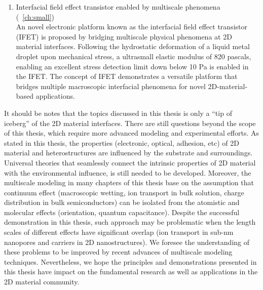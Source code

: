 \begin{enumerate}
\item Interfacial field effect transistor enabled by multiscale phenomena (~\autoref{ch:small})\\
  An novel electronic platform known as the interfacial field effect
  transistor (IFET) is proposed by bridging multiscale physical
  phenomena at 2D material interfaces. Following the hydrostatic
  deformation of a liquid metal droplet upon mechanical stress, a
  ultrasmall elastic modulus of 820 pascals, enabling an
  excellent stress detection limit down below 10 Pa is enabled in the
  IFET. The concept of IFET demonstrates a versatile platform that
  bridges multiple macroscopic interfacial phenomena for novel
  2D-material-based applications.
\end{enumerate}

It should be notes that the topics discussed in this thesis is only a
``tip of iceberg'' of the 2D material interfaces. There are still
questions beyond the scope of this thesis, which require more advanced
modeling and experimental efforts.
% 
As stated in this thesis, the properties (electronic, optical,
adhesion, etc) of 2D material and heterostructures are influenced by
the substrate and surroundings. Universal theories that seamlessly
connect the intrinsic properties of 2D material with the environmental
influence, is still needed to be developed. Moreover, the multiscale
modeling in many chapters of this thesis base on the assumption that
continuum effect (\eg macroscopic wetting, ion transport in bulk
solution, charge distribution in bulk semiconductors) can be isolated
from the atomistic and molecular effects (\eg orientation, quantum
capacitance). Despite the successful demonstration in this thesis,
such approach may be problematic when the length scales of different
effects have significant overlap (\eg ion transport in sub-nm
nanopores and carriers in 2D nano\-structures). We foresee the
understanding of these problems to be improved by recent advances of
multiscale modeling techniques.  Nevertheless, we hope the principles
and demonstrations presented in this thesis have impact on the
fundamental research as well as applications in the 2D material
community.


